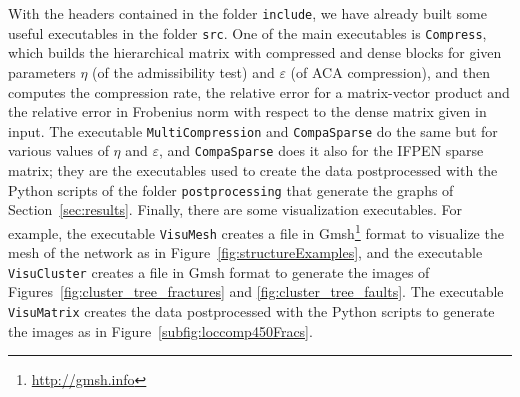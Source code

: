 \bigskip
With the headers contained in the folder \texttt{include}, we have already built some useful executables in the folder \texttt{src}. 
One of the main executables is \texttt{Compress}, which builds the hierarchical matrix with compressed and dense blocks for given parameters $\eta$ (of the admissibility test) and $\varepsilon$ (of ACA compression), and then computes the compression rate, the relative error for a matrix-vector product and the relative error in Frobenius norm with respect to the dense matrix given in input. 
The executable \texttt{MultiCompression} and \texttt{CompaSparse} do the same but for various values of $\eta$ and $\varepsilon$, and \texttt{CompaSparse} does it also for the IFPEN sparse matrix; they are the executables used to create the data postprocessed with the Python scripts of the folder \texttt{postprocessing} that generate the graphs of Section~\ref{sec:results}.
Finally, there are some visualization executables.
For example, the executable \texttt{VisuMesh} creates a file in Gmsh\footnote{\url{http://gmsh.info}} format to visualize the mesh of the network as in Figure~\ref{fig:structureExamples}, and the executable \texttt{VisuCluster} creates a file in Gmsh format to generate the images of Figures~\ref{fig:cluster_tree_fractures} and \ref{fig:cluster_tree_faults}.
The executable \texttt{VisuMatrix} creates the data postprocessed with the Python scripts to generate the images as in Figure~\ref{subfig:loccomp450Fracs}.








